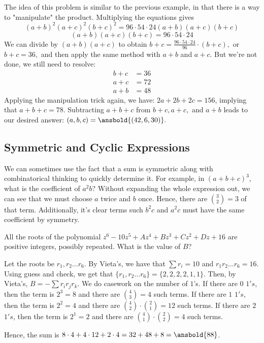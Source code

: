 \documentclass[mast]{lucky}
\begin{document}
\begin{sol}
The idea of this problem is similar to the previous example, in that there is a way to "manipulate" the product. Multiplying the equations gives
\[(a+b)^2(a+c)^2(b+c)^2 = 96 \cdot 54 \cdot 24(a+b)(a+c)(b+c)\]
\[(a+b)(a+c)(b+c)= 96 \cdot 54 \cdot 24\]
We can divide by $(a+b)(a+c)$ to obtain $b+c = \frac{96 \cdot 54 \cdot 24}{96} \cdot (b+c),$ or $b+c = 36,$ and then apply the same method with $a+b$ and $a+c.$ But we're not done, we still need to resolve:
\begin{align*}
b+c &= 36 \\
a+c &= 72\\
a+b &= 48
\end{align*}
Applying the manipulation trick again, we have: $2a +2b+2c = 156$, implying that $a+b+c = 78.$ Subtracting $a+b+c$ from $b+c,a+c,$ and $a+b$ leads to our desired answer: $(a,b,c)=\ansbold{(42,6,30)}.$
\end{sol}
\subsection{Symmetric and Cyclic Expressions}
We can sometimes use the fact that a sum is symmetric along with combinatorical thinking to quickly determine it. For example, in $(a+b+c)^3$, what is the coefficient of $a^2b$? Without expanding the whole expression out, we can see that we must choose $a$ twice and $b$ once. Hence, there are $\binom{3}{2}=3$ of that term. Additionally, it's clear terms such $b^2c$ and $a^2c$ must have the same coefficient by symmetry.

\begin{exam}[AMC 10A 2021/14]
All the roots of the polynomial $z^6-10z^5+Az^4+Bz^3+Cz^2+Dz+16$ are positive integers, possibly repeated. What is the value of $B$?
\end{exam}

\begin{sol}
Let the roots be $r_{1},r_{2}\ldots r_{6}$. By Vieta's, we have that $\sum r_{i}=10$ and $r_{1}r_{2}\ldots r_{6}=16$. Using guess and check, we get that $\{r_{1},r_{2}\ldots r_{6}\} = \{2,2,2,2,1,1\}$. Then, by Vieta's, $B=-\sum r_{i}r_{j}r_{k}$. We do casework on the number of $1$'s. If there are $0$ $1's$, then the term is $2^3=8$ and there are $\binom{4}{3}=4$ such terms. If there are $1$ $1's$, then the term is $2^2=4$ and there are $\binom{4}{2}\cdot \binom{2}{1}=12$ such terms. If there are $2$ $1's$, then the term is $2^1=2$ and there are $\binom{4}{1}\cdot \binom{2}{2}=4$ such terms.

Hence, the sum is $8\cdot 4+4\cdot 12+2\cdot 4=32+48+8=\ansbold{88}$.
\end{sol}
\end{document}

